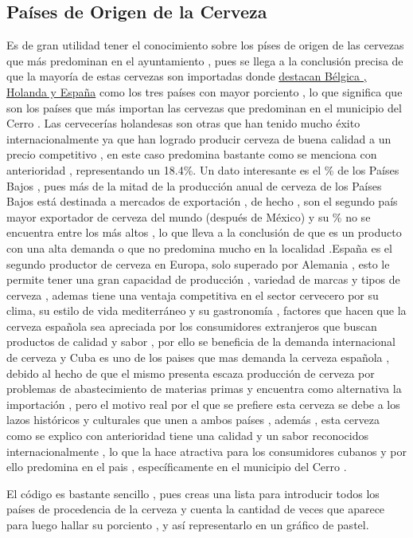 \documentclass[twocolumn,12pt]{article}
\begin{document}
\subsection{Países de Origen de la Cerveza}

Es de gran utilidad tener el conocimiento sobre los píses de origen de las cervezas que más predominan en el ayuntamiento , pues se llega a la conclusión precisa de que la mayoría de estas cervezas son importadas donde \underline{destacan Bélgica , Holanda y España} como los tres países con mayor porciento , lo que significa que son los países que más importan las cervezas que predominan en el municipio del Cerro . Las cervecerías holandesas son otras que han tenido mucho éxito internacionalmente ya que han logrado producir cerveza de buena calidad a un precio competitivo , en este caso predomina bastante como se menciona con anterioridad , representando un 18.4\%. Un dato interesante es el \% de los  Países Bajos , pues más de la mitad de la producción anual de cerveza de los Países Bajos está destinada a mercados de exportación , de hecho , son el segundo país mayor exportador de cerveza del mundo (después de México) y su \% no se encuentra entre los más altos , lo que lleva a la conclusión de que es un producto con una alta demanda o que no predomina mucho en la localidad .España es el segundo productor de cerveza en Europa, solo superado por Alemania , esto le permite tener una gran capacidad de producción , variedad de marcas y tipos de cerveza , ademas tiene una ventaja competitiva en el sector cervecero por su clima, su estilo de vida mediterráneo y su gastronomía , factores que hacen que la cerveza española sea apreciada por los consumidores extranjeros que buscan productos de calidad y sabor , por ello  se beneficia de la demanda internacional de cerveza y Cuba es uno de los paises  que mas demanda la cerveza española , debido al hecho de que el mismo  presenta escaza producción de cerveza por problemas de abastecimiento de materias primas y encuentra como alternativa la importación , pero el motivo real por el que se prefiere esta cerveza se debe a  los lazos históricos y culturales que unen a ambos países , además , esta cerveza como se explico con anterioridad  tiene una calidad y un sabor reconocidos internacionalmente , lo que la hace atractiva para los consumidores cubanos y por ello predomina en el pais , específicamente en el municipio del Cerro .

El código es bastante sencillo , pues creas una lista para introducir todos los países de procedencia de la cerveza y cuenta la cantidad de veces que aparece para luego hallar su porciento , y así representarlo en un gráfico de pastel.
\end{document}
